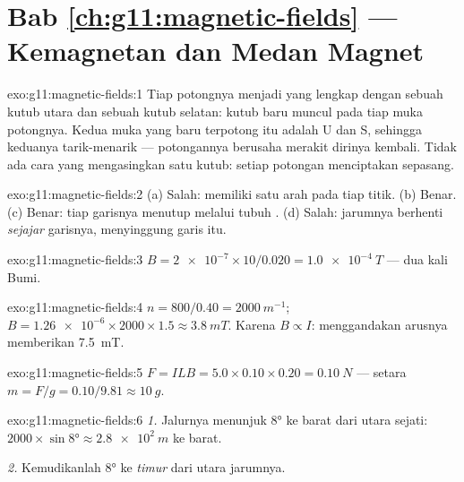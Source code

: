 \section*{Bab \ref{ch:g11:magnetic-fields} --- Kemagnetan dan Medan Magnet}

\begin{solution}{exo:g11:magnetic-fields:1}
Tiap potongnya menjadi  yang lengkap dengan sebuah kutub utara
dan sebuah kutub selatan: kutub baru muncul pada tiap muka potongnya.
Kedua muka yang baru terpotong itu adalah U dan S, sehingga keduanya
tarik-menarik --- potongannya berusaha merakit dirinya kembali. Tidak
ada cara yang mengasingkan satu kutub: setiap potongan menciptakan
sepasang.
\end{solution}

\begin{solution}{exo:g11:magnetic-fields:2}
(a) Salah:  memiliki satu arah pada tiap titik. (b) Benar.
(c) Benar: tiap garisnya menutup melalui tubuh . (d) Salah:
jarumnya berhenti \emph{sejajar} garisnya, menyinggung garis itu.
\end{solution}

\begin{solution}{exo:g11:magnetic-fields:3}
$B = \num{2e-7} \times 10 / 0.020 = \qty{1.0e-4}{T}$ --- dua kali 
Bumi.
\end{solution}

\begin{solution}{exo:g11:magnetic-fields:4}
$n = 800/0.40 = \qty{2000}{m^{-1}}$;
$B = \num{1.26e-6} \times 2000 \times 1.5 \approx \qty{3.8}{mT}$.
Karena $B \propto I$: menggandakan arusnya memberikan \qty{7.5}{mT}.
\end{solution}

\begin{solution}{exo:g11:magnetic-fields:5}
$F = ILB = 5.0 \times 0.10 \times 0.20 = \qty{0.10}{N}$ --- setara
 $m = F/g = 0.10/9.81 \approx \qty{10}{g}$.
\end{solution}

\begin{solution}{exo:g11:magnetic-fields:6}
\emph{1.} Jalurnya menunjuk $\ang{8}$ ke barat dari utara sejati:
$2000 \times \sin\ang{8} \approx \qty{2.8e2}{m}$ ke barat.

\emph{2.} Kemudikanlah $\ang{8}$ ke \emph{timur} dari utara jarumnya.
\end{solution}

